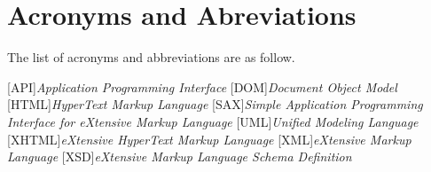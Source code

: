 \chapter*{Acronyms and Abreviations} \label{chap:acronyms}

The list of acronyms and abbreviations are as follow. \\

\begin{acronym}[Z] 

[API]{\emph{Application Programming Interface}}
[DOM]{\emph{Document Object Model}}
[HTML]{\emph{HyperText Markup Language}}
[SAX]{\emph{Simple Application Programming Interface for eXtensive Markup Language}}
[UML]{\emph{Unified Modeling Language}}
[XHTML]{\emph{eXtensive HyperText Markup Language}}
[XML]{\emph{eXtensive Markup Language}}
[XSD]{\emph{eXtensive Markup Language Schema Definition}}

\end{acronym}


